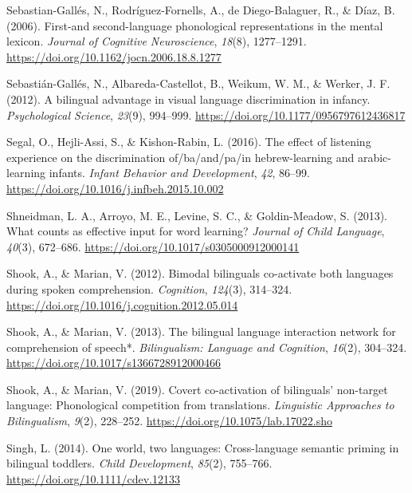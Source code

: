 \documentclass[
  12pt,
  b5paperpaper,
  twoside]{scrreprt}
\newlength{\cslhangindent}
\newlength{\cslentryspacingunit} %
\newenvironment{CSLReferences}[2] %
 {%
  \setlength{\parindent}{0pt}
  \ifodd #1
  \let\oldpar\par
  \def\par{\hangindent=\cslhangindent\oldpar}
  \fi
  \setlength{\parskip}{#2\cslentryspacingunit}
 }%
 {}
\begin{document}
\begin{CSLReferences}{1}{0}
\leavevmode{}%
Sebastian-Gallés, N., Rodríguez-Fornells, A., de Diego-Balaguer, R., \&
Díaz, B. (2006). First-and second-language phonological representations
in the mental lexicon. \emph{Journal of Cognitive Neuroscience},
\emph{18}(8), 1277--1291.
\url{https://doi.org/10.1162/jocn.2006.18.8.1277}

\leavevmode{}%
Sebastián-Gallés, N., Albareda-Castellot, B., Weikum, W. M., \& Werker,
J. F. (2012). A bilingual advantage in visual language discrimination in
infancy. \emph{Psychological Science}, \emph{23}(9), 994--999.
\url{https://doi.org/10.1177/0956797612436817}

\leavevmode{}%
Segal, O., Hejli-Assi, S., \& Kishon-Rabin, L. (2016). The effect of
listening experience on the discrimination of/ba/and/pa/in
hebrew-learning and arabic-learning infants. \emph{Infant Behavior and
Development}, \emph{42}, 86--99.
\url{https://doi.org/10.1016/j.infbeh.2015.10.002}

\leavevmode{}%
Shneidman, L. A., Arroyo, M. E., Levine, S. C., \& Goldin-Meadow, S.
(2013). What counts as effective input for word learning? \emph{Journal
of Child Language}, \emph{40}(3), 672--686.
\url{https://doi.org/10.1017/s0305000912000141}

\leavevmode{}%
Shook, A., \& Marian, V. (2012). Bimodal bilinguals co-activate both
languages during spoken comprehension. \emph{Cognition}, \emph{124}(3),
314--324. \url{https://doi.org/10.1016/j.cognition.2012.05.014}

\leavevmode{}%
Shook, A., \& Marian, V. (2013). The bilingual language interaction
network for comprehension of speech*. \emph{Bilingualism: Language and
Cognition}, \emph{16}(2), 304--324.
\url{https://doi.org/10.1017/s1366728912000466}

\leavevmode{}%
Shook, A., \& Marian, V. (2019). Covert co-activation of bilinguals'
non-target language: Phonological competition from translations.
\emph{Linguistic Approaches to Bilingualism}, \emph{9}(2), 228--252.
\url{https://doi.org/10.1075/lab.17022.sho}

\leavevmode{}%
Singh, L. (2014). One world, two languages: Cross-language semantic
priming in bilingual toddlers. \emph{Child Development}, \emph{85}(2),
755--766. \url{https://doi.org/10.1111/cdev.12133}


\end{CSLReferences}
\end{document}
